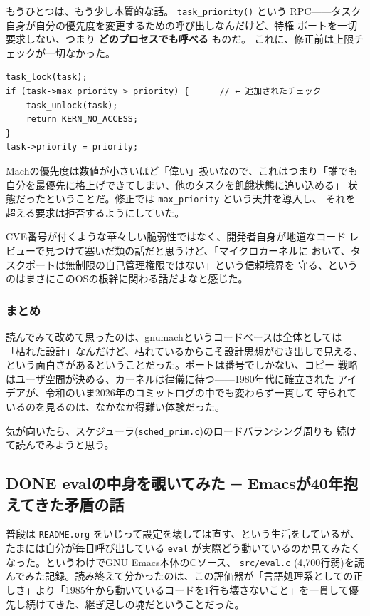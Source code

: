\documentclass[11pt]{article}
\begin{document}
もうひとつは、もう少し本質的な話。 \texttt{task\_priority()} という
RPC——タスク自身が自分の優先度を変更するための呼び出しなんだけど、特権
ポートを一切要求しない、つまり \textbf{どのプロセスでも呼べる} ものだ。
これに、修正前は上限チェックが一切なかった。

\begin{verbatim}
task_lock(task);
if (task->max_priority > priority) {      // ← 追加されたチェック
    task_unlock(task);
    return KERN_NO_ACCESS;
}
task->priority = priority;
\end{verbatim}

Machの優先度は数値が小さいほど「偉い」扱いなので、これはつまり「誰でも
自分を最優先に格上げできてしまい、他のタスクを飢餓状態に追い込める」
状態だったということだ。修正では \texttt{max\_priority} という天井を導入し、
それを超える要求は拒否するようにしていた。

CVE番号が付くような華々しい脆弱性ではなく、開発者自身が地道なコード
レビューで見つけて塞いだ類の話だと思うけど、「マイクロカーネルに
おいて、タスクポートは無制限の自己管理権限ではない」という信頼境界を
守る、というのはまさにこのOSの根幹に関わる話だよなと感じた。
\subsubsection{まとめ}
\label{sec:org001eee0}

読んでみて改めて思ったのは、gnumachというコードベースは全体としては
「枯れた設計」なんだけど、枯れているからこそ設計思想がむき出しで見える、
という面白さがあるということだった。ポートは番号でしかない、コピー
戦略はユーザ空間が決める、カーネルは律儀に待つ——1980年代に確立された
アイデアが、令和のいま2026年のコミットログの中でも変わらず一貫して
守られているのを見るのは、なかなか得難い体験だった。

気が向いたら、スケジューラ(\texttt{sched\_prim.c})のロードバランシング周りも
続けて読んでみようと思う。
\subsection{{\bfseries\sffamily DONE} evalの中身を覗いてみた ─ Emacsが40年抱えてきた矛盾の話}
\label{sec:org85d579b}
普段は \texttt{README.org} をいじって設定を壊しては直す、という生活をしているが、たまには自分が毎日呼び出している \texttt{eval} が実際どう動いているのか見てみたくなった。というわけでGNU Emacs本体のCソース、 \texttt{src/eval.c} (4,700行弱)を読んでみた記録。読み終えて分かったのは、この評価器が「言語処理系としての正しさ」より「1985年から動いているコードを1行も壊さないこと」を一貫して優先し続けてきた、継ぎ足しの塊だということだった。
\end{document}
